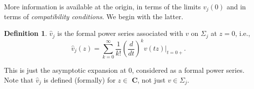 \documentclass{surv-l}
\theoremstyle{plain}
\theoremstyle{definition}
\newtheorem{definition}[theorem]{Definition}
\numberwithin{equation}{chapter}
\begin{document}
More information is available at the origin, in terms of the limits $v_{j}(0)$ and in terms of  \emph{compatibility conditions}. We begin with the latter.
\setcounter{theorem}{3}
\begin{definition}\label{defi13.4}
$\hat{v}_{j}$ is the formal power series associated with $v$ on $\Sigma_{j}$ at $z=0$, i.e.,
\begin{equation*}
\hat{v}_{j}(z)=\sum_{k=0}^{\infty}\frac{1}{k!}\left(\frac{d}{dt}\right)^{k}v(tz)|_{t=0+}.
\end{equation*}
\end{definition}
This is just the asymptotic expansion at $0$, considered as a formal power series. Note that $\hat{v}_{j}$ is defined (formally) for $z\in$ \textbf{C}, not just $v\in\Sigma_{j}$.
\end{document}
